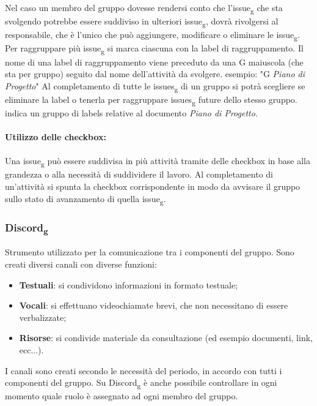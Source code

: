 Nel caso un membro del gruppo dovesse rendersi conto che l'issue\textsubscript{g} che sta svolgendo potrebbe essere suddiviso in ulteriori issue\textsubscript{g}, dovrà rivolgersi al responsabile, che è l'unico che può aggiungere, modificare o eliminare le issue\textsubscript{g}.\\
Per raggruppare più issue\textsubscript{g} si marca ciascuna con la label di raggruppamento.
Il nome di una label di raggruppamento viene preceduto da una G maiuscola (che sta per gruppo) seguito dal nome dell'attività da svolgere. esempio: "G \textit{Piano di Progetto}"
Al completamento di tutte le issues\textsubscript{g} di un gruppo si potrà scegliere se eliminare la label o tenerla per raggruppare issues\textsubscript{g} future dello stesso gruppo.
indica un gruppo di labels relative al documento \textit{Piano di Progetto}.
\\\\
\textbf{Utilizzo delle checkbox:}
\\\\
Una issue\textsubscript{g} può essere suddivisa in più attività tramite delle checkbox in base alla grandezza o
alla necessità di suddividere il lavoro. Al completamento di un'attività si spunta la checkbox
corrispondente in modo da avvisare il gruppo sullo stato di avanzamento di quella issue\textsubscript{g}.

\subsubsection{Discord\textsubscript{g}}
Strumento utilizzato per la comunicazione tra i componenti del gruppo. Sono creati diversi canali con diverse funzioni:
\begin{itemize}
	\item \textbf{Testuali}: si condividono informazioni in formato testuale;
	\item \textbf{Vocali}: si effettuano videochiamate brevi, che non necessitano di essere verbalizzate;
	\item \textbf{Risorse}: si condivide materiale da consultazione (ed esempio documenti, link, ecc...). 
\end{itemize}
I canali sono creati secondo le necessità del periodo, in accordo con tutti i componenti del gruppo.
Su Discord\textsubscript{g} è anche possibile controllare in ogni momento quale ruolo è assegnato ad ogni membro del gruppo.
